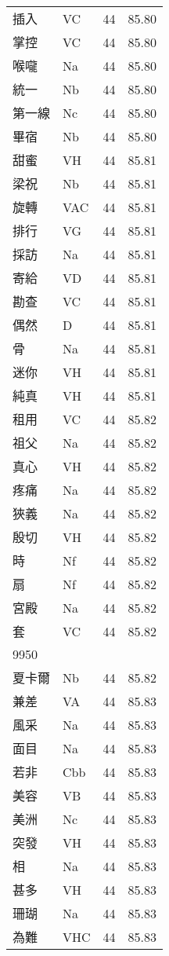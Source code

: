 \documentclass[twocolumn]{book}
\begin{document}
\begin{supertabular}{llrr}
插入 & VC & 44 &  85.80\\
掌控 & VC & 44 &  85.80\\
喉嚨 & Na & 44 &  85.80\\
統一 & Nb & 44 &  85.80\\
第一線 & Nc & 44 &  85.80\\
畢宿 & Nb & 44 &  85.80\\
甜蜜 & VH & 44 &  85.81\\
梁祝 & Nb & 44 &  85.81\\
旋轉 & VAC & 44 &  85.81\\
排行 & VG & 44 &  85.81\\
採訪 & Na & 44 &  85.81\\
寄給 & VD & 44 &  85.81\\
勘查 & VC & 44 &  85.81\\
偶然 & D & 44 &  85.81\\
骨 & Na & 44 &  85.81\\
迷你 & VH & 44 &  85.81\\
純真 & VH & 44 &  85.81\\
租用 & VC & 44 &  85.82\\
祖父 & Na & 44 &  85.82\\
真心 & VH & 44 &  85.82\\
疼痛 & Na & 44 &  85.82\\
狹義 & Na & 44 &  85.82\\
殷切 & VH & 44 &  85.82\\
時 & Nf & 44 &  85.82\\
扇 & Nf & 44 &  85.82\\
宮殿 & Na & 44 &  85.82\\
套 & VC & 44 &  85.82\\
9950\\
夏卡爾 & Nb & 44 &  85.82\\
兼差 & VA & 44 &  85.83\\
風采 & Na & 44 &  85.83\\
面目 & Na & 44 &  85.83\\
若非 & Cbb & 44 &  85.83\\
美容 & VB & 44 &  85.83\\
美洲 & Nc & 44 &  85.83\\
突發 & VH & 44 &  85.83\\
相 & Na & 44 &  85.83\\
甚多 & VH & 44 &  85.83\\
珊瑚 & Na & 44 &  85.83\\
為難 & VHC & 44 &  85.83\\

\end{supertabular}
\end{document}
